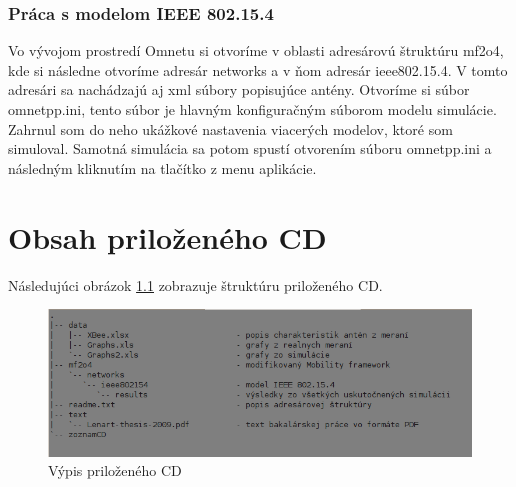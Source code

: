 \documentclass[11pt,twoside,a4paper]{book}
\begin{document}
\subsection{Práca s modelom IEEE 802.15.4}
Vo vývojom prostredí Omnetu si otvoríme v oblasti  adresárovú štruktúru mf2o4, kde si následne otvoríme adresár networks a v ňom adresár ieee802.15.4. V tomto adresári sa nachádzajú aj xml súbory popisujúce antény. Otvoríme si súbor omnetpp.ini, tento súbor je hlavným konfiguračným súborom modelu simulácie. Zahrnul som do neho ukážkové nastavenia viacerých modelov, ktoré som simuloval. Samotná simulácia sa potom spustí otvorením súboru omnetpp.ini a následným kliknutím na tlačítko  z menu aplikácie.

\chapter{Obsah priloženého CD}

Následujúci obrázok \ref{fig:zoznamCD} zobrazuje štruktúru priloženého CD.

\begin{figure}[h]
\begin{center}
\includegraphics[width=14cm]{./figures/zoznamCD.png}
\caption{Výpis priloženého CD}
\label{fig:zoznamCD}
\end{center}
\end{figure}
\end{document}
